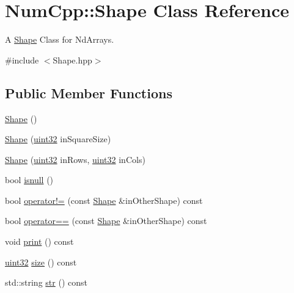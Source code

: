 \hypertarget{class_num_cpp_1_1_shape}{}\section{Num\+Cpp\+:\+:Shape Class Reference}
\label{class_num_cpp_1_1_shape}


A \mbox{\hyperlink{class_num_cpp_1_1_shape}{Shape}} Class for Nd\+Arrays.  




{\ttfamily \#include $<$Shape.\+hpp$>$}

\subsection*{Public Member Functions}
\begin{DoxyCompactItemize}
\item 
\mbox{\hyperlink{class_num_cpp_1_1_shape_abb6de2ea6cd701a0dac5dabd07b6e0a6}{Shape}} ()
\item 
\mbox{\hyperlink{class_num_cpp_1_1_shape_a4d6b5503593f769c34b3e0321247589a}{Shape}} (\mbox{\hyperlink{namespace_num_cpp_a36f388e948380413c63011cab9b7fbd5}{uint32}} in\+Square\+Size)
\item 
\mbox{\hyperlink{class_num_cpp_1_1_shape_affab31438afcdb05bc9bd4c2d594b7ec}{Shape}} (\mbox{\hyperlink{namespace_num_cpp_a36f388e948380413c63011cab9b7fbd5}{uint32}} in\+Rows, \mbox{\hyperlink{namespace_num_cpp_a36f388e948380413c63011cab9b7fbd5}{uint32}} in\+Cols)
\item 
bool \mbox{\hyperlink{class_num_cpp_1_1_shape_a88d385a8c0651a666413543dde4a176f}{isnull}} ()
\item 
bool \mbox{\hyperlink{class_num_cpp_1_1_shape_ad7df56e67409d2a3e859ae25dce960f7}{operator!=}} (const \mbox{\hyperlink{class_num_cpp_1_1_shape}{Shape}} \&in\+Other\+Shape) const
\item 
bool \mbox{\hyperlink{class_num_cpp_1_1_shape_a902f3cf35a49e27f766eb75acd1d6159}{operator==}} (const \mbox{\hyperlink{class_num_cpp_1_1_shape}{Shape}} \&in\+Other\+Shape) const
\item 
void \mbox{\hyperlink{class_num_cpp_1_1_shape_a555a16decafeac68b21fa1db8761f859}{print}} () const
\item 
\mbox{\hyperlink{namespace_num_cpp_a36f388e948380413c63011cab9b7fbd5}{uint32}} \mbox{\hyperlink{class_num_cpp_1_1_shape_abc2041396c701f43f04e8ec13262c4ba}{size}} () const
\item 
std\+::string \mbox{\hyperlink{class_num_cpp_1_1_shape_a83449c64eb5e4a1df88fe13288507340}{str}} () const
\end{DoxyCompactItemize}
